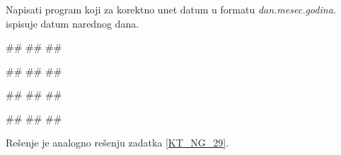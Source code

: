 \begin{Exercise}[label=KT_NG_30] 
 Napisati program koji za korektno unet datum u formatu \textit{dan.mesec.godina.} ispisuje datum narednog dana. 
 
\begin{miditest}
\begin{upotreba}{1}
#\naslovInt#
##
##
\end{upotreba}
\end{miditest}
\begin{miditest}
\begin{upotreba}{2}
#\naslovInt#
##
##
\end{upotreba}
\end{miditest}

\begin{miditest}
\begin{upotreba}{3}
#\naslovInt#
##
##
\end{upotreba}
\end{miditest}
\begin{miditest}
\begin{upotreba}{4}
#\naslovInt#
##
##
\end{upotreba}
\end{miditest}

\end{Exercise}
\ifresenja
\begin{Answer}[ref=KT_NG_30]
 
Rešenje je analogno rešenju zadatka \ref{KT_NG_29}.
\end{Answer}
\fi


